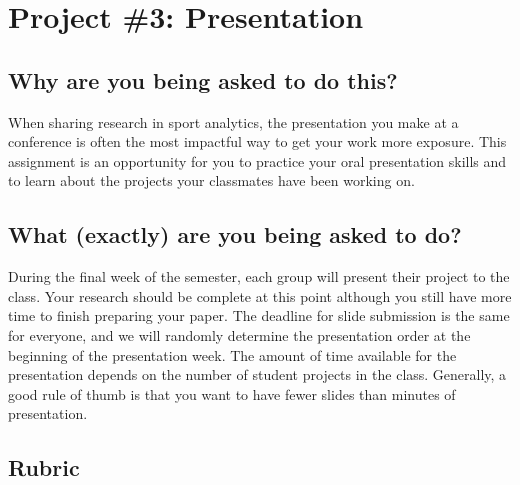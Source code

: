 \documentclass{article}
\begin{document}
  \newpage
  \section*{\sc Project \#3: Presentation}

    \subsection*{\sc Why are you being asked to do this?}

      When sharing research in sport analytics, the presentation you make at a conference is often the most impactful way to get your work more exposure. This assignment is an opportunity for you to practice your oral presentation skills and to learn about the projects your classmates have been working on.
    
    \subsection*{\sc What (exactly) are you being asked to do?}

      During the final week of the semester, each group will present their project to the class. Your research should be complete at this point although you still have more time to finish preparing your paper. The deadline for slide submission is the same for everyone, and we will randomly determine the presentation order at the beginning of the presentation week. The amount of time available for the presentation depends on the number of student projects in the class. Generally, a good rule of thumb is that you want to have fewer slides than minutes of presentation.

    \subsection*{\sc Rubric}
\end{document}
